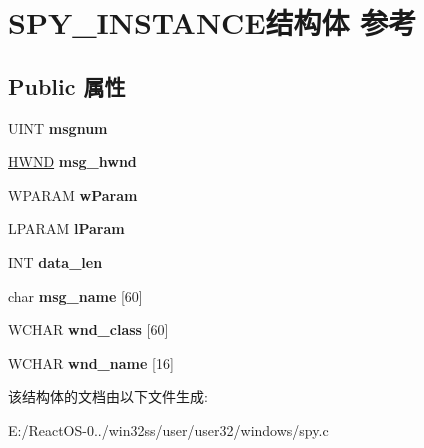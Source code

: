 \hypertarget{struct_s_p_y___i_n_s_t_a_n_c_e}{}\section{S\+P\+Y\+\_\+\+I\+N\+S\+T\+A\+N\+C\+E结构体 参考}
\label{struct_s_p_y___i_n_s_t_a_n_c_e}
\subsection*{Public 属性}
\begin{DoxyCompactItemize}
\item 
\mbox{\label{struct_s_p_y___i_n_s_t_a_n_c_e_a69ecd66dad8309b6178677442dc30ab2}} 
U\+I\+NT {\bfseries msgnum}
\item 
\mbox{\label{struct_s_p_y___i_n_s_t_a_n_c_e_a97305a0a244f9da518c6e79d4b66bf98}} 
\hyperlink{interfacevoid}{H\+W\+ND} {\bfseries msg\+\_\+hwnd}
\item 
\mbox{\label{struct_s_p_y___i_n_s_t_a_n_c_e_a40da964fae96df2e4768ffdbeec4c610}} 
W\+P\+A\+R\+AM {\bfseries w\+Param}
\item 
\mbox{\label{struct_s_p_y___i_n_s_t_a_n_c_e_a1c745817ca83d6b2a333ba38be4b923c}} 
L\+P\+A\+R\+AM {\bfseries l\+Param}
\item 
\mbox{\label{struct_s_p_y___i_n_s_t_a_n_c_e_a0c4aedde88b1e90424d1b1c468dd3817}} 
I\+NT {\bfseries data\+\_\+len}
\item 
\mbox{\label{struct_s_p_y___i_n_s_t_a_n_c_e_a1cf768c2135ade6c1f4e5110ab406b83}} 
char {\bfseries msg\+\_\+name} \mbox{[}60\mbox{]}
\item 
\mbox{\label{struct_s_p_y___i_n_s_t_a_n_c_e_ae42f9d2dfaba0678ebc35ebe6becf93d}} 
W\+C\+H\+AR {\bfseries wnd\+\_\+class} \mbox{[}60\mbox{]}
\item 
\mbox{\label{struct_s_p_y___i_n_s_t_a_n_c_e_a8c4b956b1d9d3baab76d65c16401bfc5}} 
W\+C\+H\+AR {\bfseries wnd\+\_\+name} \mbox{[}16\mbox{]}
\end{DoxyCompactItemize}


该结构体的文档由以下文件生成\+:\begin{DoxyCompactItemize}
\item 
E\+:/\+React\+O\+S-\/0../win32ss/user/user32/windows/spy.\+c\end{DoxyCompactItemize}
